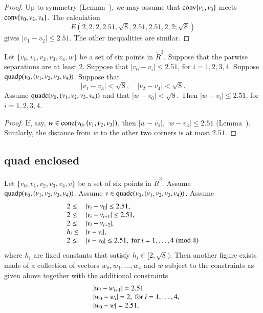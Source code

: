 \begin{proof}
Up to symmetry (Lemma~), we may assume
that ${\operatorname{conv}}\{v_1,v_3\}$ meets ${\operatorname{conv}}\{v_0,v_2,v_4\}$.
The calculation
   $$
   E(2,2,2,2.51,\sqrt8,2.51,2.51,2,2; \sqrt8)
   $$
gives $|v_1-v_2|\le 2.51$. The other inequalities are similar.
\end{proof}

\newpage

\begin{lemma} 
Let $\{v_0,v_1,v_2,v_3,v_4,w\}$ be a set of six points in
$\ring{R}^3$.  Suppose that the parwise separations are at
least $2$.  
Suppose that $|v_0-v_i|\le 2.51$, for $i=1,2,3,4$.
Suppose ${\operatorname{quadp}}(v_0,(v_1,v_2,v_3,v_4))$.
Suppose that
  $$|v_1-v_3|<\sqrt8,\quad |v_2-v_4| <\sqrt8.$$
Assume ${\operatorname{quadc}}(v_0,(v_1,v_2,v_3,v_4))$ and that $|w-v_0|<\sqrt8$.
Then $|w-v_i|\le 2.51$, for $i=1,2,3,4$.
\end{lemma}


\begin{proof}
If, say, $w\in {\operatorname{cone}}(v_0,\{v_1,v_2,v_3\})$, then
$|w-v_1|$, $|w-v_3|\le 2.51$ (Lemma~).
 Similarly, the distance from
$w$ to the other two corners is at most $2.51$.
\end{proof}

\newpage
\subsection{quad enclosed}


\begin{lemma}
Let $\{v_0,v_1,v_2,v_3,v_4,v\}$ be a set of six points in
$\ring{R}^3$.  Assume ${\operatorname{quadp}}(v_0,(v_1,v_2,v_3,v_4))$.
Assume $v\in {\operatorname{quadc}}(v_0,(v_1,v_2,v_3,v_4))$.
Assume 
    $$\begin{array}{lll}
    2\le &|v_i-v_0|\le 2.51,\\
    2\le&|v_i-v_{i+1}|\le 2.51, \\
    2\le&|v_i-v_{i+2}|,\\
    h_i\le &|v-v_i|, \\
    2\le &|v-v_0|\le 2.51, \hbox{ for }
        i=1,\ldots,4 \ (\hbox{mod } 4)\\
    \end{array}
    $$
where $h_i$ are fixed constants that satisfy
$h_i\in[2,\sqrt{8})$.  
Then another figure exists made of
a collection of vectors $w_0,w_1,\ldots,w_4$ and $w$ subject to
the constraints as given above together with the additional constraints
    $$\begin{array}{lll}
    &|w_i-w_{i+1}|=2.51\\
    &|w_0-w_i|=2, \hbox { for } i=1,\ldots,4,\\
    &|w_0-w|=2.51.
    \end{array}
    $$
\end{lemma}

